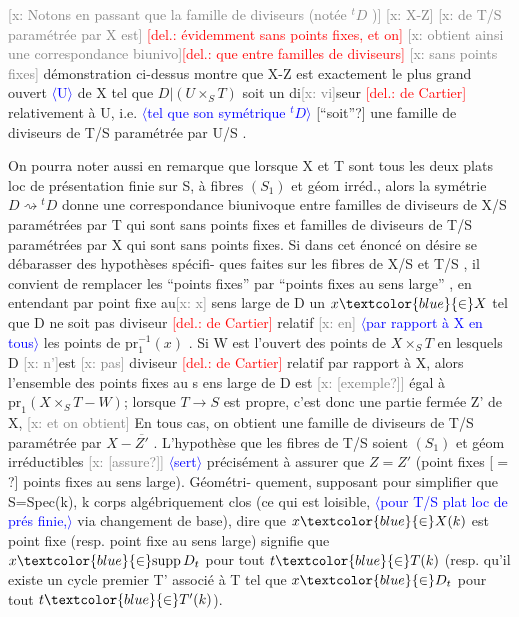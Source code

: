 \documentclass[11pt]{article}
\newcommand{\scanpage}[1]{\par\bigskip\noindent{\small\sffamily[scan #1]}\par}
\newcommand{\mspage}[1]{{\small\sffamily[p.\,#1]}}
\newcommand{\hand}[1]{\textcolor{blue}{#1}}
\newcommand{\inserted}[2][]{\textcolor{blue}{$\langle$#2$\rangle$}}
\newcommand{\deleted}[1]{\textcolor{red}{[\textsf{del.:} #1]}}
\newcommand{\xout}[1]{\textcolor{gray}{[\textsf{x:} #1]}}
\newcommand{\unsure}[1]{[#1?]}
\begin{document}
\xout{Notons en passant que la famille de diviseurs (notée ${}^{t}D$ )}
\xout{X-Z}
\xout{de T/S paramétrée par X est} \deleted{évidemment sans points fixes, et on}
\xout{obtient ainsi une correspondance biunivo}\deleted{que entre familles de diviseurs}
\xout{sans points fixes} démonstration ci-dessus montre que X-Z est exactement
le plus grand ouvert \inserted{U} de X tel que $D|(U\times_S T)$ soit un di\xout{vi}seur \deleted{de Cartier}
relativement à U, i.e. \inserted{tel que son symétrique ${}^{t}D$} \unsure{``soit''} une famille de diviseurs de T/S paramétrée
par U/S .

\mspage{\hand{113}}

\clearpage
\scanpage{25/114}
\mspage{17}

On pourra noter aussi en remarque que lorsque X et T sont tous les
deux plats loc de présentation finie sur S, à fibres $(S_1)$ et géom irréd.,
alors la symétrie $D \rightsquigarrow {}^{t}D$ donne une correspondance biunivoque entre
familles de diviseurs de X/S paramétrées par T qui sont sans points fixes
et familles de diviseurs de T/S paramétrées par X qui sont sans points
fixes. Si dans cet énoncé on désire se débarasser des hypothèses spécifi-%
ques faites sur les fibres de X/S et T/S , il convient de remplacer
les ``points fixes'' par ``points fixes au sens large'' , en entendant par
point fixe au\xout{x} sens large de D un $x \hand{\in} X$ tel que D ne soit pas diviseur
\deleted{de Cartier} relatif \xout{en} \inserted[typed]{par rapport à X en tous} les points de $\mathrm{pr}_1^{-1}(x)$ . Si W est l'ouvert des
points de $X\times_S T$ en lesquels D \xout{n'}est \xout{pas} diviseur \deleted{de Cartier} relatif par
rapport à X, alors l'ensemble des points fixes au s ens large de D est
\xout{\unsure{exemple}} égal à $\mathrm{pr}_1(X\times_S T - W)$; lorsque $T \to S$ est propre, c'est donc
une partie fermée Z' de X, \xout{et on obtient} En tous cas, on obtient une
famille de diviseurs de T/S paramétrée par $X-\overline{Z'}$ . L'hypothèse que les
fibres de T/S soient $(S_1)$ et géom irréductibles \xout{\unsure{assure}} \inserted[typed]{sert} précisément à
assurer que $Z=Z'$ (point fixes \unsure{$=$} points fixes au sens large). Géométri-%
quement, supposant pour simplifier que S=Spec(k), k corps algébriquement
clos (ce qui est loisible, \inserted[typed]{pour T/S plat loc de prés finie,} via changement de base), dire que $x \hand{\in} X(k)$
est point fixe (resp. point fixe au sens large) signifie que $x \hand{\in} \mathrm{supp}\, D_t$
pour tout $t \hand{\in} T(k)$ (resp. qu'il existe un cycle premier T' associé à T
tel que $x \hand{\in} D_t$ pour tout $t \hand{\in} T'(k)$).
\end{document}
